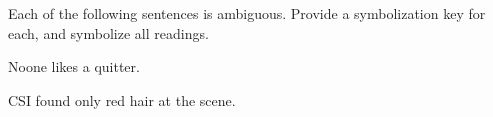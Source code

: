 			\begin{practiceproblems}
				\problempart
				Each of the following sentences is ambiguous. Provide a symbolization key for each, and symbolize all readings.
				\begin{problemslist}
					\item Noone likes a quitter.
					\item CSI found only red hair at the scene.
				\end{problemslist}
				
				
			\end{practiceproblems}
			
			
			
